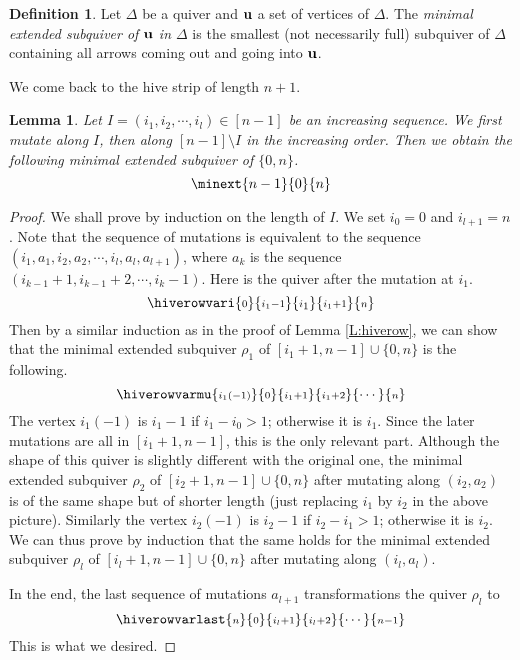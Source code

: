 \documentclass{amsart}
\newtheorem{lemma}[theorem]{Lemma}
\theoremstyle{definition}
\newtheorem{definition}[theorem]{Definition}
\theoremstyle{remark}
\numberwithin{equation}{section}
\renewcommand{\b}[1]{\bold{#1}}
\newcommand{\bs}[1]{\boldsymbol{#1}}
\newcommand{\innerprod}[1]{\langle#1\rangle}
\renewcommand{\ss}[1]{{\scriptstyle{#1}}}
\begin{document}
\begin{definition} Let $\Delta$ be a quiver and $\b{u}$ a set of vertices of $\Delta$.
	The {\em minimal extended subquiver of $\b{u}$ in $\Delta$} is the smallest (not necessarily full) subquiver of $\Delta$ containing all arrows coming out and going into $\b{u}$.
\end{definition}

We come back to the hive strip of length $n+1$.
\begin{lemma} \label{L:longrow} Let $I=(i_1,i_2,\cdots,i_l)\in [n-1]$ be an increasing sequence.
	We first mutate along $I$, then along $[n-1]\setminus I$ in the increasing order. 
Then we obtain the following minimal extended subquiver of $\{0,n\}$.
$$\minext{n-1}{0}{n}$$
\end{lemma}
\begin{proof} We shall prove by induction on the length of $I$. We set $i_0=0$ and $i_{l+1}=n$.
	Note that the sequence of mutations is equivalent to the sequence $(i_1,a_1,i_2,a_2,\cdots,i_l,a_l,a_{l+1})$,
	where $a_k$ is the sequence $(i_{k-1}+1,i_{k-1}+2,\cdots,i_k-1)$.	
	Here is the quiver after the mutation at $i_1$.
	$$\hiverowvari{\ss 0}{\ss{i_1-1}}{\ss i_1}{\ss{i_1+1}}{\ss n}$$	
	Then by a similar induction as in the proof of Lemma \ref{L:hiverow}, we can show that 
	the minimal extended subquiver $\rho_1$ of $[i_1+1,n-1]\cup \{0,n\}$ is the following.
$$\hiverowvarmu{\ss{i_1(-1)}}{\ss{0}}{\ss{i_1+1}}{\ss{i_1+2}}{\cdots}{\ss{n}}$$
The vertex $i_1(-1)$ is $i_1-1$ if $i_1-i_0>1$; otherwise it is $i_1$.
	Since the later mutations are all in $[i_1+1,n-1]$, this is the only relevant part.
Although the shape of this quiver is slightly different with the original one,
the minimal extended subquiver $\rho_2$ of $[i_2+1,n-1]\cup \{0,n\}$ after mutating along $(i_2,a_2)$
is of the same shape but of shorter length (just replacing $i_1$ by $i_2$ in the above picture).
Similarly the vertex $i_2(-1)$ is $i_2-1$ if $i_2-i_1>1$; otherwise it is $i_2$.
We can thus prove by induction that the same holds for the minimal extended subquiver $\rho_{l}$ of $[i_{l}+1,n-1]\cup\{0,n\}$ after mutating along $(i_{l},a_{l})$.

In the end, the last sequence of mutations $a_{l+1}$ transformations the quiver $\rho_{l}$ to
$$\hiverowvarlast{\ss{n}}{\ss 0}{\ss{i_l+1}}{\ss{i_l+2}}{\cdots}{\ss{n-1}}$$
This is what we desired.
\end{proof}
\end{document}
